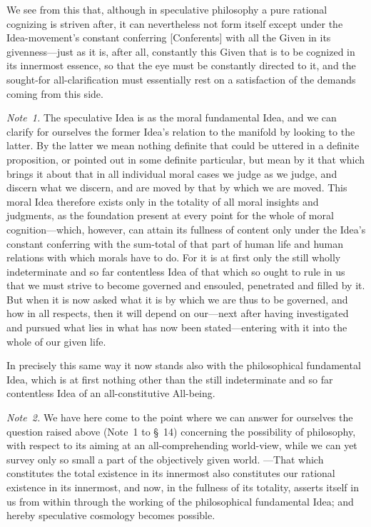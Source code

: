 \documentclass[12pt,a4paper]{book}
\begin{document}
We see from this that, although in speculative philosophy a pure rational cognizing
is striven after, it can nevertheless not form itself except under the
Idea-movement's constant conferring [Conferents] with all the Given in its
givenness---just as it is, after all, constantly this Given that is to be cognized in
its innermost essence, so that the eye must be constantly directed to it, and the
sought-for all-clarification must essentially rest on a satisfaction of the demands
coming from this side.

{\small\emph{Note~1.} The speculative Idea is as the moral fundamental Idea, and we
can clarify for ourselves the former Idea's relation to the manifold by looking to
the latter. By the latter we mean nothing definite that could be uttered in a
definite proposition, or pointed out in some definite particular, but mean by it
that which brings it about that in all individual moral cases we judge as we judge,
and discern what we discern, and are moved by that by which we are moved. This moral
Idea therefore exists only in the totality of all moral insights and judgments, as
the foundation present at every point for the whole of moral cognition---which,
however, can attain its fullness of content only under the Idea's constant conferring
with the sum-total of that part of human life and human relations with which morals
have to do. For it is at first only the still wholly indeterminate and so far
contentless Idea of that which so ought to rule in us that we must strive to become
governed and ensouled, penetrated and filled by it. But when it is now asked what it
is by which we are thus to be governed, and how in all respects, then it will depend
on our---next after having investigated and pursued what lies in what has now been
stated---entering with it into the whole of our given life.\par}

{\small In precisely this same way it now stands also with the philosophical
fundamental Idea, which is at first nothing other than the still indeterminate and so
far contentless Idea of an all-constitutive All-being.\par}

{\small\emph{Note~2.} We have here come to the point where we can answer for
ourselves the question raised above (Note~1 to \S~14) concerning the possibility of
philosophy, with respect to its aiming at an all-comprehending world-view, while we
can yet survey only so small a part of the objectively given world. ---That which
constitutes the total existence in its innermost also constitutes our rational
existence in its innermost, and now, in the fullness of its totality, asserts itself
in us from within through the working of the philosophical fundamental Idea; and
hereby speculative cosmology becomes possible.\par}
\end{document}
